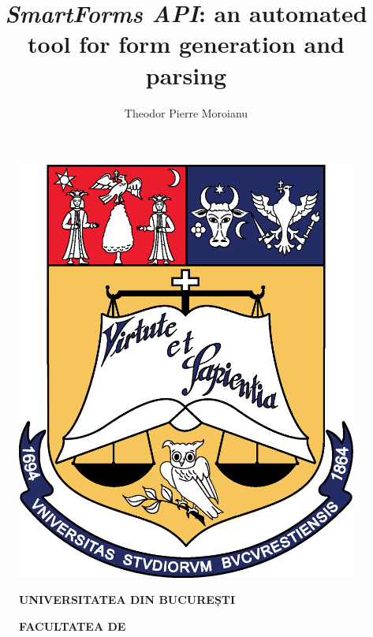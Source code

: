 \documentclass[12pt, a4paper]{report}
\title{\emph{SmartForms API}: an automated tool for form generation and parsing}
\author{Theodor Pierre Moroianu}
\begin{document}
\cleardoublepage
\pagestyle{front}
\let\ps@plain\ps@front

\begin{titlepage}

  
  \begin{figure}[!htb]
      \centering
      \begin{minipage}{0.2\textwidth}
          \includegraphics[width=\linewidth]{logo-ub.png}
      \end{minipage}
      \begin{minipage}{0.5\textwidth}
          \large
          \vspace{0.2cm}
          \begin{center}
              \textbf{UNIVERSITATEA DIN BUCUREȘTI}
          \end{center}
          \vspace{0.3cm}
          \begin{center}
              \textbf{
                  FACULTATEA DE \\
}
\end{center}
\end{minipage}
\end{figure}
\end{titlepage}
\end{document}
